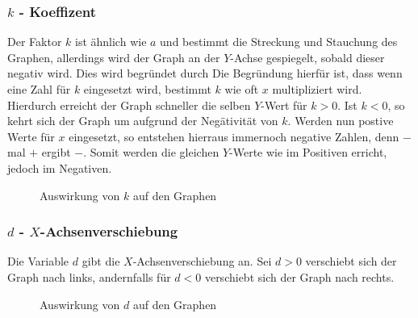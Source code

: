 \subsubsection{$k$ - Koeffizent} \label{sec:e-Funktion/Umformung von der normalen Exponentialfunktion zu der E-Funktion/Normalform/k - Koeffizent}
Der Faktor $k$ ist ähnlich wie $a$ und bestimmt die Streckung und Stauchung des Graphen, allerdings wird der Graph an der $Y$-Achse gespiegelt, sobald dieser negativ wird. Dies wird begründet durch 
Die Begründung hierfür ist, dass wenn eine Zahl für $k$ eingesetzt wird, bestimmt $k$ wie oft $x$ multipliziert wird. Hierdurch erreicht der Graph schneller die selben $Y$-Wert für $k>0$. Ist $k<0$, so kehrt sich der Graph um aufgrund der Negätivität von $k$. Werden nun postive Werte für $x$ eingesetzt, so entstehen hierraus immernoch negative Zahlen, denn $-$ mal $+$ ergibt $-$. Somit werden die gleichen $Y$-Werte wie im Positiven erricht, jedoch im Negativen.
\begin{figure}[h]
\centering
	\caption{Auswirkung von $k$ auf den Graphen}
\end{figure}


\pagebreak
\subsubsection{$d$ - $X$-Achsenverschiebung}\label{sec:E-Funktion/Umformung von der normalen Exponentialfunktion zu der E-Funktion/Normalform/d - X-Achsenverschiebung}
Die Variable $d$ gibt die $X$-Achsenverschiebung an. Sei $d>0$ verschiebt sich der Graph nach links, andernfalls für $d<0$ verschiebt sich der Graph nach rechts. 
\begin{figure}[h]
\centering
	\caption{Auswirkung von $d$ auf den Graphen}
\end{figure}

